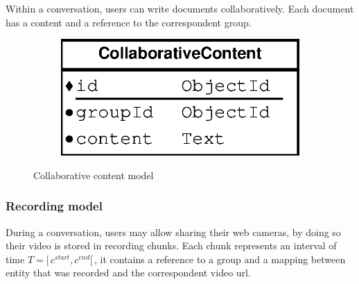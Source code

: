 Within a conversation, users can write documents collaboratively. Each document has a content and a reference to the correspondent group. 

\begin{figure}[H]
    \centering
    \begin{subfigure}[b]{0.3\textwidth}
    	\includegraphics[width=\textwidth]{figures/model_collaborative_content}
    \end{subfigure}
    \caption{Collaborative content model}
\end{figure} 

\subsubsection{Recording model}

During a conversation, users may allow sharing their web cameras, by doing so their video is stored in recording chunks. Each chunk represents an interval of time  $T=[ \,c^{start},c^{end}[ \,$, it contains a reference to a group and a mapping between entity that was recorded and the correspondent video url.

